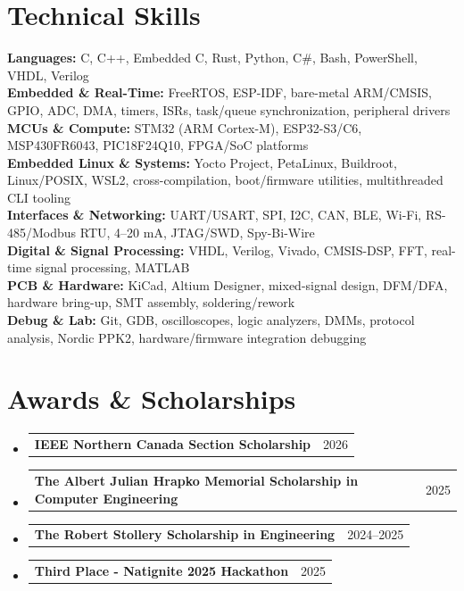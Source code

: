 \documentclass[letterpaper,11pt]{article}
\makeatletter
\newcommand{\resumeAward}[2]{
  \item
  \begin{tabular*}{0.97\textwidth}{l@{\extracolsep{\fill}}r}
    \small #1 & \small #2 \\
  \end{tabular*}\vspace{-6pt}
}
\newcommand{\resumeSubHeadingListStart}{\begin{itemize}[leftmargin=0.15in, label={}]}
\newcommand{\resumeSubHeadingListEnd}{\end{itemize}\vspace{-1pt}}
\makeatother
\begin{document}
\section{Technical Skills}
 \begin{itemize}[leftmargin=0.15in, label={}]
    \small{\item{
     \textbf{Languages:} C, C++, Embedded C, Rust, Python, C\#, Bash, PowerShell, VHDL, Verilog \\
     \textbf{Embedded \& Real-Time:} FreeRTOS, ESP-IDF, bare-metal ARM/CMSIS, GPIO, ADC, DMA, timers, ISRs, task/queue synchronization, peripheral drivers \\
     \textbf{MCUs \& Compute:} STM32 (ARM Cortex-M), ESP32-S3/C6, MSP430FR6043, PIC18F24Q10, FPGA/SoC platforms \\
     \textbf{Embedded Linux \& Systems:} Yocto Project, PetaLinux, Buildroot, Linux/POSIX, WSL2, cross-compilation, boot/firmware utilities, multithreaded CLI tooling \\
     \textbf{Interfaces \& Networking:} UART/USART, SPI, I2C, CAN, BLE, Wi-Fi, RS-485/Modbus RTU, 4--20 mA, JTAG/SWD, Spy-Bi-Wire \\
     \textbf{Digital \& Signal Processing:} VHDL, Verilog, Vivado, CMSIS-DSP, FFT, real-time signal processing, MATLAB \\
     \textbf{PCB \& Hardware:} KiCad, Altium Designer, mixed-signal design, DFM/DFA, hardware bring-up, SMT assembly, soldering/rework \\
     \textbf{Debug \& Lab:} Git, GDB, oscilloscopes, logic analyzers, DMMs, protocol analysis, Nordic PPK2, hardware/firmware integration debugging
    }}
 \end{itemize}

\section{Awards \& Scholarships}
  \resumeSubHeadingListStart
    \resumeAward{\textbf{IEEE Northern Canada Section Scholarship}}{2026}
    \resumeAward{\textbf{The Albert Julian Hrapko Memorial Scholarship in Computer Engineering}}{2025}
    \resumeAward{\textbf{The Robert Stollery Scholarship in Engineering}}{2024--2025}
    \resumeAward{\textbf{Third Place - Natignite 2025 Hackathon}}{2025}
  \resumeSubHeadingListEnd
\end{document}
